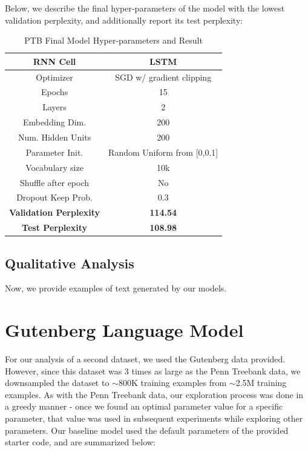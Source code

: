 \documentclass[a4paper]{article}
\begin{document}
Below, we describe the final hyper-parameters of the model with the lowest validation perplexity, and additionally report its test perplexity:
\begin{table}[H]
\centering
\begin{tabular}{|c | c|} 
 \hline
RNN Cell & LSTM\\ \hline
Optimizer & SGD w/ gradient clipping \\ \hline
Epochs & 15\\ \hline
Layers & 2\\ \hline
Embedding Dim. & 200\\ \hline
Num. Hidden Units & 200\\ \hline
Parameter Init. & Random Uniform from [0,0.1]\\ \hline
Vocabulary size & 10k\\ \hline
Shuffle after epoch & No \\ \hline
Dropout Keep Prob. & 0.3 \\ \hline
\textbf{Validation Perplexity} &\textbf{114.54} \\ \hline
\textbf{Test Perplexity} &\textbf{108.98} \\ \hline
\end{tabular}
\caption{PTB Final Model Hyper-parameters and Result}
\label{table:1}
\end{table}

\subsection{Qualitative Analysis}

Now, we provide examples of text generated by our models. 


\section*{Gutenberg Language Model}
For our analysis of a second dataset, we used the Gutenberg data provided. However, since this dataset was 3 times as large as the Penn Treebank data, we downsampled the dataset to $\sim$800K training examples from $\sim$2.5M training examples. As with the Penn Treebank data, our exploration process was done in a greedy manner - once we found an optimal parameter value for a specific parameter, that value was used in subsequent experiments while exploring other parameters. Our baseline model used the default parameters of the provided starter code, and are summarized below:
\end{document}
